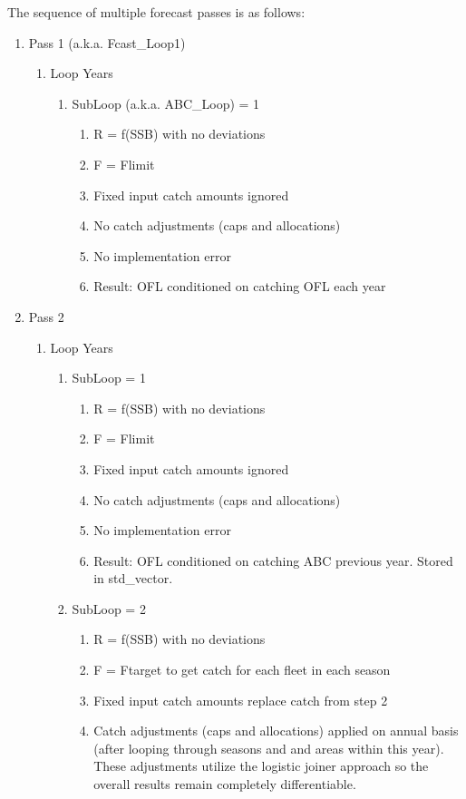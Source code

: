 The sequence of multiple forecast passes is as follows:
\begin{enumerate}
	\item Pass 1 (a.k.a. Fcast\_Loop1)
	\begin{enumerate}
		\item Loop Years
		\begin{enumerate}
			\item SubLoop (a.k.a. ABC\_Loop) = 1
			\begin{enumerate}
				\item R = f(SSB) with no deviations
				\item F = Flimit
				\item Fixed input catch amounts ignored
				\item No catch adjustments (caps and allocations)
				\item No implementation error
				\item Result: OFL conditioned on catching OFL each year
			\end{enumerate}
		\end{enumerate}
	\end{enumerate}
	\item Pass 2
	\begin{enumerate}
		\item Loop Years
		\begin{enumerate}
			\item SubLoop = 1
			\begin{enumerate}
				\item R = f(SSB) with no deviations
				\item F = Flimit
				\item Fixed input catch amounts ignored
				\item No catch adjustments (caps and allocations)
				\item No implementation error
				\item Result: OFL conditioned on catching ABC previous year. Stored in std\_vector.
			\end{enumerate}
			\item SubLoop = 2
			\begin{enumerate}
				\item R = f(SSB) with no deviations
				\item F = Ftarget to get catch for each fleet in each season
				\item Fixed input catch amounts replace catch from step 2
				\item Catch adjustments (caps and allocations) applied on annual basis (after looping through seasons and and areas within this year). These adjustments utilize the logistic joiner approach so the overall results remain completely differentiable.

\end{enumerate}
\end{enumerate}
\end{enumerate}
\end{enumerate}
